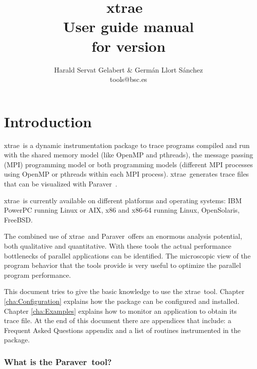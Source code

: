 \documentclass[twoside,a4,english,11pt]{book}
\newcommand{\TRACE}{{\sf {E}xtrae}\ }
\newcommand{\PARAVER}{{\sf Paraver}\ }
\begin{document}


\title{\TRACE \\
       User guide manual\\
       for version \TRACEVERSION}
\author{
Harald Servat Gelabert \& Germ\'an Llort S\'anchez\\
tools@bsc.es
}

\maketitle
\tableofcontents
\listoffigures
\listoftables






\chapter{Introduction}\label{cha:Introduction}

\TRACE is a dynamic instrumentation package to trace programs compiled and run with the shared memory model (like OpenMP and pthreads), the message passing (MPI) programming model or both programming models (different MPI processes using OpenMP or pthreads within each MPI process). \TRACE generates trace files that can be visualized with \PARAVER.

\TRACE is currently available on different platforms and operating systems: IBM PowerPC running Linux or AIX, x86 and x86-64 running Linux, OpenSolaris, FreeBSD.

The combined use of \TRACE and \PARAVER offers an enormous analysis potential, both qualitative and quantitative. With these tools the actual performance bottlenecks of parallel applications can be identified. The microscopic view of the program behavior that the tools provide is very useful to optimize the parallel program performance.

This document tries to give the basic knowledge to use the \TRACE tool. Chapter \ref{cha:Configuration} explains how the package can be configured and installed. Chapter \ref{cha:Examples} explains how to monitor an application to obtain its trace file. At the end of this document there are appendices that include: a Frequent Asked Questions appendix and a list of routines instrumented in the package.

\subsection*{What is the \PARAVER tool?}
\end{document}
